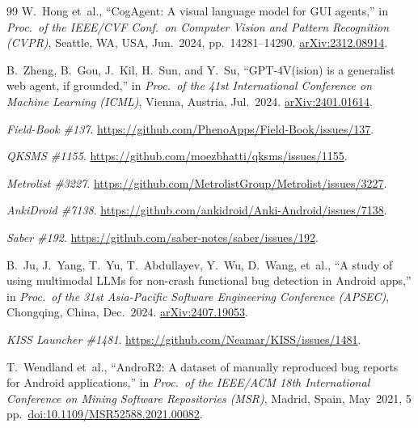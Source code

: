 \documentclass[10pt,conference,a4paper]{IEEEtran}
\begin{document}
\begin{thebibliography}{99}
  W.~Hong et~al.,
  ``CogAgent: A visual language model for GUI agents,''
  in \emph{Proc.\ of the IEEE/CVF Conf.\ on Computer Vision and
  Pattern Recognition (CVPR)}, Seattle, WA, USA, Jun.\ 2024,
  pp.~14281--14290.
  \href{https://arxiv.org/abs/2312.08914}{arXiv:2312.08914}.

  B.~Zheng, B.~Gou, J.~Kil, H.~Sun, and Y.~Su,
  ``GPT-4V(ision) is a generalist web agent, if grounded,''
  in \emph{Proc.\ of the 41st International Conference on Machine
  Learning (ICML)}, Vienna, Austria, Jul.\ 2024.
  \href{https://arxiv.org/abs/2401.01614}{arXiv:2401.01614}.


  \emph{Field-Book \#137}.
  \url{https://github.com/PhenoApps/Field-Book/issues/137}.

  \emph{QKSMS \#1155}.
  \url{https://github.com/moezbhatti/qksms/issues/1155}.


  \emph{Metrolist \#3227}.
  \url{https://github.com/MetrolistGroup/Metrolist/issues/3227}.


  \emph{AnkiDroid \#7138}.
  \url{https://github.com/ankidroid/Anki-Android/issues/7138}.

  \emph{Saber \#192}.
  \url{https://github.com/saber-notes/saber/issues/192}.

  B.~Ju, J.~Yang, T.~Yu, T.~Abdullayev, Y.~Wu, D.~Wang, et~al.,
  ``A study of using multimodal LLMs for non-crash functional bug
  detection in Android apps,''
  in \emph{Proc.\ of the 31st Asia-Pacific Software Engineering
  Conference (APSEC)}, Chongqing, China, Dec.~2024.
  \href{https://arxiv.org/abs/2407.19053}{arXiv:2407.19053}.

  \emph{KISS Launcher \#1481}.
  \url{https://github.com/Neamar/KISS/issues/1481}.

  T.~Wendland et~al.,
  ``AndroR2: A dataset of manually reproduced bug reports for Android
  applications,''
  in \emph{Proc.\ of the IEEE/ACM 18th International Conference on
  Mining Software Repositories (MSR)}, Madrid, Spain, May~2021, 5 pp.\
  \href{https://doi.org/10.1109/MSR52588.2021.00082}{doi:10.1109/MSR52588.2021.00082}.


\end{thebibliography}
\end{document}
